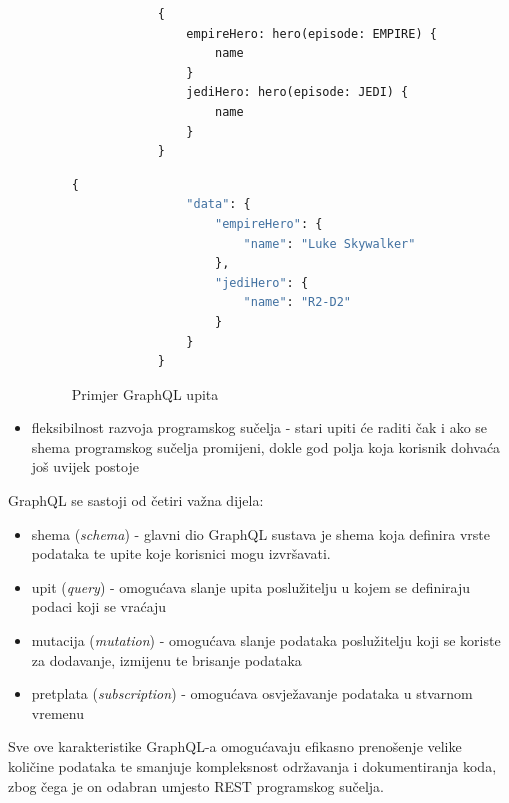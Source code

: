 \documentclass[zavrsnirad]{fer}
\begin{document}
\begin{itemize}
 	\begin{figure}[htb]
 		\centering
 		 	\begin{lstlisting}
 			{
 				empireHero: hero(episode: EMPIRE) {
 					name
 				}
 				jediHero: hero(episode: JEDI) {
 					name
 				}
 			}
 		\end{lstlisting}
 		\begin{lstlisting}[language=GraphQL]
 			{
 				"data": {
 					"empireHero": {
 						"name": "Luke Skywalker"
 					},
 					"jediHero": {
 						"name": "R2-D2"
 					}
 				}
 			}
 		\end{lstlisting}
 		\caption{Primjer GraphQL upita}
 	\end{figure}
 	\FloatBarrier
 	
  	\item {fleksibilnost razvoja programskog sučelja} - stari upiti će raditi čak i ako se shema programskog sučelja promijeni, dokle god polja koja korisnik dohvaća još uvijek postoje
 \end{itemize}
GraphQL se sastoji od četiri važna dijela:
\begin{itemize}
	\item shema (\textit{schema}) - glavni dio GraphQL sustava je shema koja definira vrste podataka te upite koje korisnici mogu izvršavati.
	\item upit (\textit{query}) - omogućava slanje upita poslužitelju u kojem se definiraju podaci koji se vraćaju
	\item mutacija (\textit{mutation}) - omogućava slanje podataka poslužitelju koji se koriste za dodavanje, izmijenu te brisanje podataka
	\item pretplata (\textit{subscription}) - omogućava osvježavanje podataka u stvarnom vremenu
\end{itemize}
Sve ove karakteristike GraphQL-a omogućavaju efikasno prenošenje velike količine podataka te smanjuje kompleksnost održavanja i dokumentiranja koda, zbog čega je on odabran umjesto REST programskog sučelja.
\end{document}
